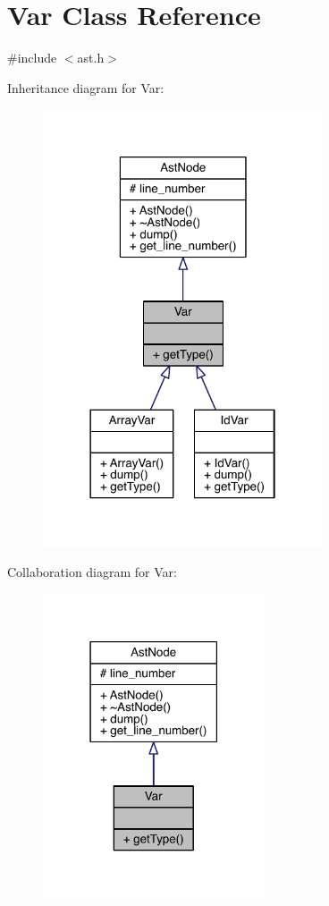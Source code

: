\hypertarget{class_var}{}\section{Var Class Reference}
\label{class_var}


{\ttfamily \#include $<$ast.\+h$>$}



Inheritance diagram for Var\+:\nopagebreak
\begin{figure}[H]
\begin{center}
\leavevmode
\includegraphics[width=234pt]{class_var__inherit__graph}
\end{center}
\end{figure}


Collaboration diagram for Var\+:\nopagebreak
\begin{figure}[H]
\begin{center}
\leavevmode
\includegraphics[width=186pt]{class_var__coll__graph}
\end{center}
\end{figure}
